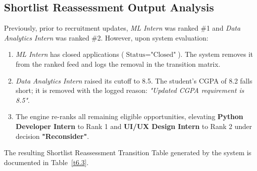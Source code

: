 \subsection{Shortlist Reassessment Output Analysis}
Previously, prior to recruitment updates, \textit{ML Intern} was ranked \#1 and \textit{Data Analytics Intern} was ranked \#2. However, upon system evaluation:
\begin{enumerate}[label=\textbf{\alph*)}]
	\item \textit{ML Intern} has closed applications ($\text{Status} = \text{"Closed"}$). The system removes it from the ranked feed and logs the removal in the transition matrix.
	\item \textit{Data Analytics Intern} raised its cutoff to 8.5. The student's CGPA of 8.2 falls short; it is removed with the logged reason: \textit{"Updated CGPA requirement is 8.5"}.
	\item The engine re-ranks all remaining eligible opportunities, elevating \textbf{Python Developer Intern} to Rank 1 and \textbf{UI/UX Design Intern} to Rank 2 under decision \textbf{"Reconsider"}.
\end{enumerate}

The resulting Shortlist Reassessment Transition Table generated by the system is documented in Table~\ref{t6.3}.

\begin{table}[h!]
\centering
\caption{Dynamic Shortlist Reassessment Transition Matrix for Mystery Mission}
\label{t6.3}
\end{table}

